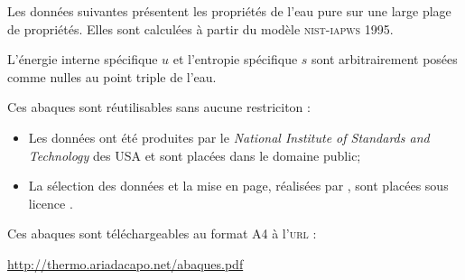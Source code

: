 Les données suivantes présentent les propriétés de l’eau pure sur une large plage de propriétés.
Elles sont calculées à partir du modèle \textsc{nist-iapws} 1995.

L’énergie interne spécifique $u$ et l’entropie spécifique $s$
sont arbitrairement posées comme nulles au point triple de l’eau.

Ces abaques sont réutilisables sans aucune restriciton :
\begin{itemize}
	\item Les données ont été produites par le \textit{National Institute of Standards and Technology} des USA et sont placées dans le domaine public;
	\item La sélection des données et la mise en page, réalisées par \olivier, sont placées sous licence \cczero.
\end{itemize}

Ces abaques sont téléchargeables au format A4 à l’\textsc{url} :
\begin{center}\href{http://thermo.ariadacapo.net/abaques.pdf}{http://thermo.ariadacapo.net/abaques.pdf}\end{center}
